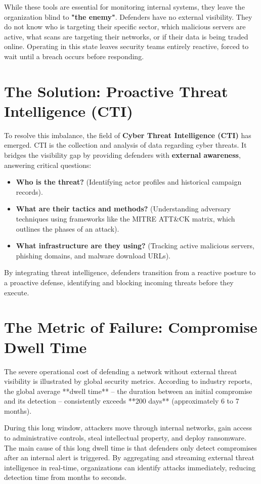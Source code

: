 While these tools are essential for monitoring internal systems, they leave the organization blind to \textbf{"the enemy"}. Defenders have no external visibility. They do not know who is targeting their specific sector, which malicious servers are active, what scans are targeting their networks, or if their data is being traded online. Operating in this state leaves security teams entirely reactive, forced to wait until a breach occurs before responding.

\section*{The Solution: Proactive Threat Intelligence (CTI)}
To resolve this imbalance, the field of \textbf{Cyber Threat Intelligence (CTI)} has emerged. CTI is the collection and analysis of data regarding cyber threats. It bridges the visibility gap by providing defenders with \textbf{external awareness}, answering critical questions:
\begin{itemize}
    \item \textbf{Who is the threat?} (Identifying actor profiles and historical campaign records).
    \item \textbf{What are their tactics and methods?} (Understanding adversary techniques using frameworks like the MITRE ATT\&CK matrix, which outlines the phases of an attack).
    \item \textbf{What infrastructure are they using?} (Tracking active malicious servers, phishing domains, and malware download URLs).
\end{itemize}

By integrating threat intelligence, defenders transition from a reactive posture to a proactive defense, identifying and blocking incoming threats before they execute.

\section*{The Metric of Failure: Compromise Dwell Time}
The severe operational cost of defending a network without external threat visibility is illustrated by global security metrics. According to industry reports, the global average **dwell time** -- the duration between an initial compromise and its detection -- consistently exceeds **200 days** (approximately 6 to 7 months). 

During this long window, attackers move through internal networks, gain access to administrative controls, steal intellectual property, and deploy ransomware. The main cause of this long dwell time is that defenders only detect compromises after an internal alert is triggered. By aggregating and streaming external threat intelligence in real-time, organizations can identify attacks immediately, reducing detection time from months to seconds.

